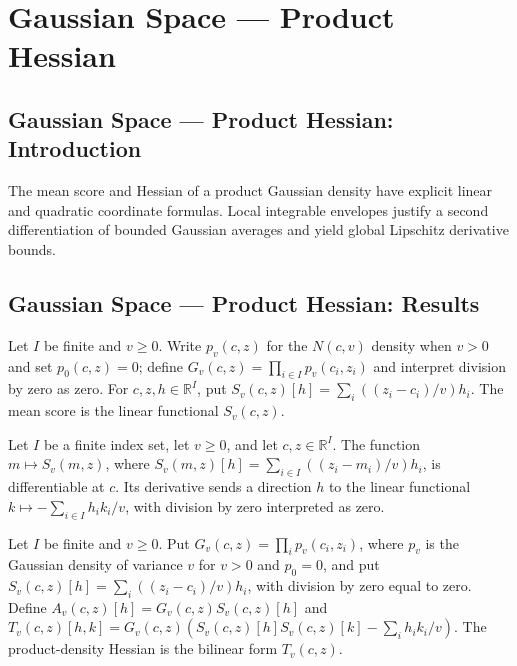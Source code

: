 \section{Gaussian Space --- Product Hessian}
\subsection*{Gaussian Space --- Product Hessian: Introduction}
The mean score and Hessian of a product Gaussian density have explicit linear and quadratic coordinate formulas. Local integrable envelopes justify a second differentiation of bounded Gaussian averages and yield global Lipschitz derivative bounds.

\subsection*{Gaussian Space --- Product Hessian: Results}

\begin{definition}
\leanok
Let $I$ be finite and $v\ge0$. Write $p_v(c,z)$ for the $N(c,v)$ density when $v>0$ and set $p_0(c,z)=0$; define $G_v(c,z)=\prod_{i\in I}p_v(c_i,z_i)$ and interpret division by zero as zero. For $c,z,h\in\mathbb R^I$, put $S_v(c,z)[h]=\sum_i((z_i-c_i)/v)h_i$. The mean score is the linear functional $S_v(c,z)$.
\end{definition}

\begin{lemma}
\leanok
{}
Let $I$ be a finite index set, let $v\ge0$, and let $c,z\in\mathbb R^I$. The function
$m\mapsto S_v(m,z)$, where $S_v(m,z)[h]=\sum_{i\in I}((z_i-m_i)/v)h_i$, is
differentiable at $c$. Its derivative sends a direction $h$ to the linear functional
$k\mapsto-\sum_{i\in I}h_i k_i/v$, with division by zero interpreted as zero.
\end{lemma}

\begin{definition}
\leanok
{}
Let $I$ be finite and $v\ge0$. Put $G_v(c,z)=\prod_i p_v(c_i,z_i)$, where $p_v$ is the Gaussian density of variance $v$ for $v>0$ and $p_0=0$, and put $S_v(c,z)[h]=\sum_i((z_i-c_i)/v)h_i$, with division by zero equal to zero. Define $A_v(c,z)[h]=G_v(c,z)S_v(c,z)[h]$ and $T_v(c,z)[h,k]=G_v(c,z)(S_v(c,z)[h]S_v(c,z)[k]-\sum_i h_i k_i/v)$. The product-density Hessian is the bilinear form $T_v(c,z)$.
\end{definition}

